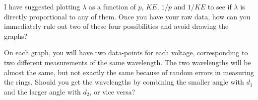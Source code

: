 \prelabquestion  I have suggested plotting $\lambda $ as a function of
$p$, $KE$, $1/p$ and $1/KE$ to see if $\lambda $
is directly proportional to any of them. Once you have your
raw data, how can you immediately rule out two of these four
possibilities and avoid drawing the graphs?

\prelabquestion  On each graph, you will have two data-points for each
voltage, corresponding to two different measurements of the
same wavelength. The two wavelengths will be almost the
same, but not exactly the same because of random errors in
measuring the rings. Should you get the wavelengths by
combining the smaller angle with $d_1$ and the larger angle
with $d_2$, or vice versa?
